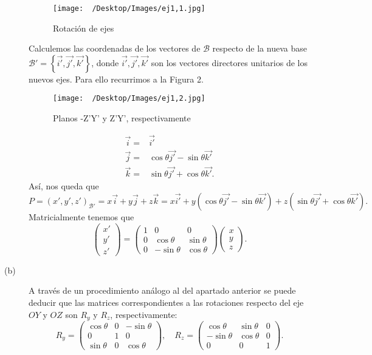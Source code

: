 \documentclass{article}
\begin{document}
\begin{sol}
\begin{description}
	\begin{figure}
	\centering
	\texttt{[image: ~/Desktop/Images/ej1,1.jpg]}
	\caption{Rotación de ejes}
	\label{}
	\end{figure}
	Calculemos las coordenadas de los vectores de $\displaystyle \mathcal{B} $ respecto de la nueva base $\displaystyle \mathcal{B'} = \left\{ \vec{i'}, \vec{j'}, \vec{k'}\right\}  $, donde $\displaystyle \vec{i'}, \vec{j'}, \vec{k'} $ son los vectores directores unitarios de los nuevos ejes. Para ello recurrimos a la Figura 2.
	\begin{figure}
	\centering
	\texttt{[image: ~/Desktop/Images/ej1,2.jpg]}
	\caption{Planos -Z'Y' y Z'Y', respectivamente}
	\label{ enter label$}
	\end{figure}
		\[
		\begin{split}
			\vec{i} = & \vec{i'} \\ 
			\vec{j} = & \cos \theta \vec{j'} - \sin \theta \vec{k'} \\
			\vec{k} = & \sin \theta \vec{j'} + \cos \theta \vec{k'}.
		\end{split}
		\]
		Así, nos queda que 
		\[ P = \left(x',y',z'\right)_{\mathcal{B'}}= x \vec{i} + y \vec{j}  + z \vec{k} = x\vec{i'} + y\left(\cos\theta \vec{j'} - \sin \theta \vec{k'}\right) + z\left(\sin \theta \vec{j'} + \cos \theta \vec{k'}\right) .\]
	Matricialmente tenemos que
	\[ \begin{pmatrix} x' \\ y' \\ z' \end{pmatrix} = \begin{pmatrix} 1 & 0& 0 \\
0 & \cos \theta& \sin \theta\\
0 & - \sin \theta & \cos \theta\end{pmatrix}\begin{pmatrix} x \\ y \\ z \end{pmatrix}.\]
\item[(b)] A través de un procedimiento análogo al del apartado anterior se puede deducir que las matrices correspondientes a las rotaciones respecto del eje $\displaystyle OY $ y $\displaystyle OZ $ son $\displaystyle R_{y} $ y $\displaystyle R_{z} $, respectivamente:
		\[R_{y} = \begin{pmatrix} \cos \theta & 0 & -\sin \theta \\ 0 & 1 & 0 \\  \sin \theta & 0 & \cos \theta \end{pmatrix}, \quad R_{z} = \begin{pmatrix} \cos \theta &  \sin \theta & 0 \\ -\sin \theta & \cos \theta & 0 \\ 0 & 0 & 1\end{pmatrix} .\]

\end{description}
\end{sol}
\end{document}

